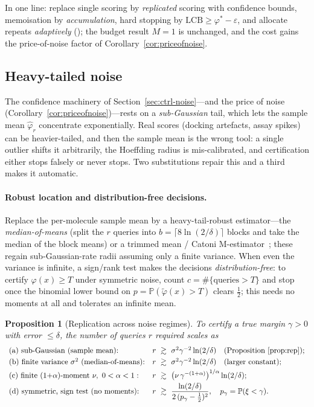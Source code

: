 \documentclass[11pt,a4paper]{article}
\newtheorem{proposition}[theorem]{Proposition}
\newcommand{\Prob}{\mathbb{P}}
\newcommand{\phist}{\varphi^*}
\begin{document}
In one line: replace single scoring by \emph{replicated} scoring with
confidence bounds, memoisation by \emph{accumulation}, hard stopping by
$\mathrm{LCB}\ge\phist-\varepsilon$, and allocate repeats \emph{adaptively}
(); the budget result $M=1$ is unchanged, and the cost gains the
price-of-noise factor of Corollary~\ref{cor:priceofnoise}.

\subsection{Heavy-tailed noise}
\label{sec:ctrl-heavy}

The confidence machinery of Section~\ref{sec:ctrl-noise}---and the price
of noise (Corollary~\ref{cor:priceofnoise})---rests on a \emph{sub-Gaussian}
tail, which lets the sample mean $\widehat\varphi_r$ concentrate
exponentially.  Real scores (docking artefacts, assay spikes) can be
heavier-tailed, and then the sample mean is the wrong tool: a single
outlier shifts it arbitrarily, the Hoeffding radius is mis-calibrated, and
certification either stops falsely or never stops.  Two substitutions
repair this and a third makes it automatic.

\paragraph{Robust location and distribution-free decisions.}
Replace the per-molecule sample mean by a heavy-tail-robust estimator---the
\emph{median-of-means} (split the $r$ queries into
$b=\lceil8\ln(2/\delta)\rceil$ blocks and take the median of the block
means) or a trimmed mean / Catoni M-estimator~\cite{Catoni2012,LugosiMendelson2019};
these regain sub-Gaussian-rate radii assuming only a finite variance.  When
even the variance is infinite, a sign/rank test makes the decisions
\emph{distribution-free}: to certify $\varphi(x)\ge T$ under symmetric
noise, count $c=\#\{\text{queries}>T\}$ and stop once the binomial lower
bound on $p=\Prob(\tilde\varphi(x)>T)$ clears $\tfrac12$; this needs no
moments at all and tolerates an infinite mean.

\begin{proposition}[Replication across noise regimes]\label{prop:heavy}
  To certify a true margin $\gamma>0$ with error $\le\delta$, the number of
  queries $r$ required scales as
  \[
  \begin{array}{ll}
   \text{(a) sub-Gaussian (sample mean):}
     & r\ \gtrsim\ \sigma^2\gamma^{-2}\ln(2/\delta)\quad(\text{Proposition~\ref{prop:rep}});\\[3pt]
   \text{(b) finite variance }\sigma^2\text{ (median-of-means):}
     & r\ \gtrsim\ \sigma^2\gamma^{-2}\ln(2/\delta)\quad(\text{larger constant});\\[3pt]
   \text{(c) finite }(1{+}\alpha)\text{-moment }\nu,\ 0<\alpha<1:
     & r\ \gtrsim\ \bigl(\nu\,\gamma^{-(1+\alpha)}\bigr)^{1/\alpha}\ln(2/\delta);\\[3pt]
   \text{(d) symmetric, sign test (no moments):}
     & r\ \gtrsim\ \dfrac{\ln(2/\delta)}{2\,(p_\gamma-\tfrac12)^2},\quad p_\gamma=\Prob(\xi<\gamma).
  \end{array}
  \]
\end{proposition}
\end{document}

